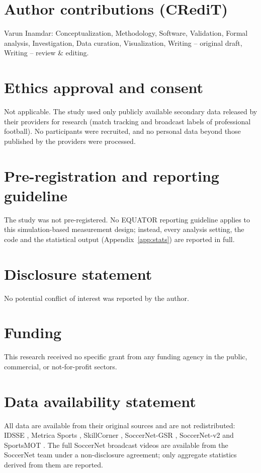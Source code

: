 \documentclass[]{interact}
\begin{document}
\section*{Author contributions (CRediT)}
Varun Inamdar: Conceptualization, Methodology, Software, Validation, Formal analysis, Investigation, Data curation,
Visualization, Writing -- original draft, Writing -- review \& editing.

\section*{Ethics approval and consent}
Not applicable. The study used only publicly available secondary data released by their providers for research
(match tracking and broadcast labels of professional football). No participants were recruited, and no personal data
beyond those published by the providers were processed.

\section*{Pre-registration and reporting guideline}
The study was not pre-registered. No EQUATOR reporting guideline applies to this simulation-based measurement design;
instead, every analysis setting, the code and the statistical output (Appendix~\ref{app:stats}) are reported in full.

\section*{Disclosure statement}
No potential conflict of interest was reported by the author.

\section*{Funding}
This research received no specific grant from any funding agency in the public, commercial, or not-for-profit
sectors.

\section*{Data availability statement}
All data are available from their original sources and are not redistributed: IDSSE \citep{bassek2025idsse}, Metrica
Sports \citep{metrica_sample}, SkillCorner \citep{skillcorner_opendata}, SoccerNet-GSR \citep{somers2024gsr},
SoccerNet-v2 \citep{deliege2021soccernetv2} and SportsMOT \citep{cui2023sportsmot}. The full SoccerNet broadcast
videos are available from the SoccerNet team under a non-disclosure agreement; only aggregate statistics derived from
them are reported.
\end{document}
